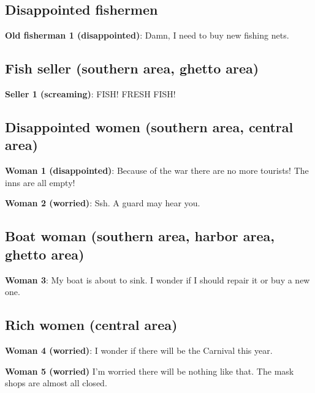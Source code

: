 \subsection{Disappointed fishermen}
\textbf{Old fisherman 1 (disappointed)}: Damn, I need to buy new fishing nets.

\subsection{Fish seller (southern area, ghetto area)}
\textbf{Seller 1 (screaming)}: FISH! FRESH FISH!

\subsection{Disappointed women (southern area, central area)}
\textbf{Woman 1 (disappointed)}: Because of the war there are no more tourists! The inns are all empty!

\textbf{Woman 2 (worried)}: Ssh. A guard may hear you.

\subsection{Boat woman (southern area, harbor area, ghetto area)}
\textbf{Woman 3}: My boat is about to sink. I wonder if I should repair it or buy a new one.

\subsection{Rich women (central area)}
\textbf{Woman 4 (worried)}: I wonder if there will be the Carnival this year.

\textbf{Woman 5 (worried)} I'm worried there will be nothing like that. The mask shops are almost all closed.
